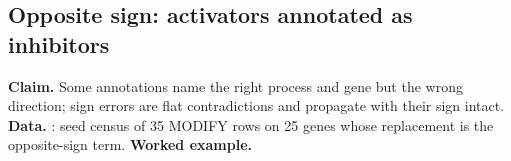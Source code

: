 \subsection{Opposite sign: activators annotated as inhibitors}\label{sec:dd-sign}
\textbf{Claim.} Some annotations name the right process and gene but the wrong direction; sign
errors are flat contradictions and propagate with their sign intact.
\textbf{Data.} : seed census of 35 MODIFY rows on 25 genes whose
replacement is the opposite-sign term. 
\textbf{Worked example.} 
